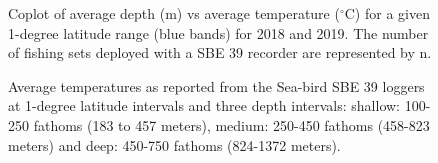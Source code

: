 \documentclass[12pt]{article}\usepackage[]{graphicx}\usepackage[]{color}
\begin{document}
\begin{figure}[htb]

{\centering {} 

}

\caption{Coplot of average depth (m) vs average temperature (\(^\circ\)C) for a given 1-degree latitude range (blue bands) for 2018 and 2019. The number of fishing sets deployed with a SBE 39 recorder are represented by n.}\label{fig:figure14}
\end{figure}
\clearpage


\begin{figure}[htb]

{\centering {} 

}

\caption{Average temperatures as reported from the Sea-bird SBE 39 loggers at 1-degree latitude intervals and three depth intervals: shallow: 100-250 fathoms (183 to 457 meters), medium: 250-450 fathoms (458-823 meters) and deep: 450-750 fathoms (824-1372 meters).}\label{fig:figure15}
\end{figure}
\clearpage
\end{document}
